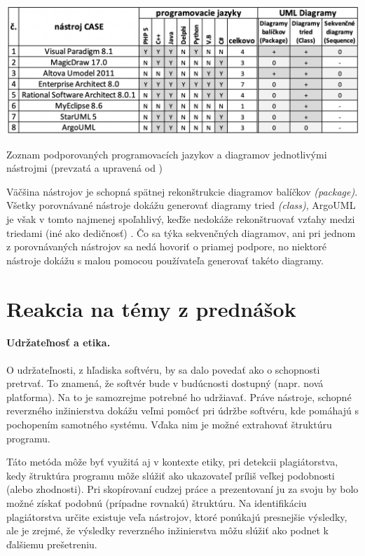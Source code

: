 \documentclass[10pt,twoside,slovak,a4paper]{article}
\begin{document}
\begin{table}[h]
\centering
\includegraphics[width=1.2\textwidth]{tabulka_nastrojov.png}
\caption{Zoznam podporovaných programovacích jazykov a diagramov jednotlivými nástrojmi (prevzatá a upravená od \cite{Osman:RE})}
\label{tabulka2}
\end{table}
 
 Väčšina nástrojov je schopná spätnej rekonštrukcie diagramov balíčkov \emph{(package)}. Všetky porovnávané nástroje dokážu generovať diagramy tried \emph{(class)}, ArgoUML je však v tomto najmenej spoľahlivý, keďže nedokáže rekonštruovať vzťahy medzi triedami (iné ako dedičnosť) \cite{Osman:RE}. Čo sa týka sekvenčných diagramov, ani pri jednom z porovnávaných nástrojov sa nedá hovoriť o priamej podpore, no niektoré nástroje dokážu s malou pomocou používateľa generovať takéto diagramy.
 
 \section{Reakcia na témy z prednášok}
\paragraph{Udržateľnosť a etika.} 
O udržateľnosti, z hľadiska softvéru, by sa dalo povedať ako o schopnosti pretrvať. To znamená, že softvér bude v budúcnosti dostupný (napr. nová platforma). Na to je samozrejme potrebné ho udržiavať. Práve nástroje, schopné reverzného inžinierstva dokážu veľmi pomôcť pri údržbe softvéru, kde pomáhajú s pochopením samotného systému. Vďaka nim je možné extrahovať štruktúru programu. 

Táto metóda môže byť využitá aj v kontexte etiky, pri detekcii plagiátorstva, kedy štruktúra programu môže slúžiť ako ukazovateľ príliš veľkej podobnosti (alebo zhodnosti). Pri skopírovaní cudzej práce a prezentovaní ju za svoju by bolo možné získať podobnú (prípadne rovnakú) štruktúru. Na identifikáciu plagiátorstva určite existuje veľa nástrojov, ktoré ponúkajú presnejšie výsledky, ale je zrejmé, že výsledky reverzného inžinierstva môžu slúžiť ako podnet k ďalšiemu prešetreniu.
\end{document}
